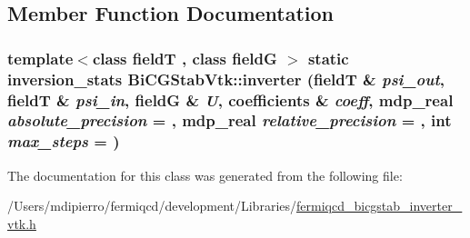 \subsection{Member Function Documentation}
\hypertarget{class_bi_c_g_stab_vtk_a482170748a679733c475311ae45f014f}{
\subsubsection[{inverter}]{\setlength{\rightskip}{0pt plus 5cm}template$<$class fieldT , class fieldG $>$ static {\bf inversion\_\-stats} BiCGStabVtk::inverter (fieldT \& {\em psi\_\-out}, \/  fieldT \& {\em psi\_\-in}, \/  fieldG \& {\em U}, \/  {\bf coefficients} \& {\em coeff}, \/  {\bf mdp\_\-real} {\em absolute\_\-precision} = {}, \/  {\bf mdp\_\-real} {\em relative\_\-precision} = {}, \/  int {\em max\_\-steps} = {})}}
\label{class_bi_c_g_stab_vtk_a482170748a679733c475311ae45f014f}


The documentation for this class was generated from the following file:\begin{DoxyCompactItemize}
\item 
/Users/mdipierro/fermiqcd/development/Libraries/\hyperlink{fermiqcd__bicgstab__inverter__vtk_8h}{fermiqcd\_\-bicgstab\_\-inverter\_\-vtk.h}\end{DoxyCompactItemize}
